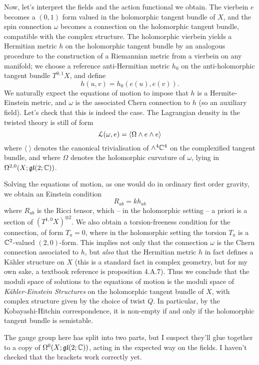 \documentclass[10pt, oneside]{article}
\begin{document}
Now, let's interpret the fields and the action functional we obtain.  The vierbein $e$ becomes a $(0,1)$ form valued in the holomorphic tangent bundle of $X$, and the spin connection $\omega$ becomes a connection on the holomorphic tangent bundle, compatible with the complex structure.  The holomorphic vierbein yields a Hermitian metric $h$ on the holomorphic tangent bundle by an analogous procedure to the construction of a Riemannian metric from a vierbein on any manifold; we choose a reference anti-Hermitian metric $h_0$ on the anti-holomorphic tangent bundle $T^{0,1}X$, and define
\[h(u, v) = h_0(e(u), e(v)).\]
We naturally expect the equations of motion to impose that $h$ is a Hermite-Einstein metric, and $\omega$ is the associated Chern connection to $h$ (so an auxiliary field).  Let's check that this is indeed the case.  The Lagrangian density in the twisted theory is still of form 
\[\mathcal{L}(\omega, e) = \langle \Omega \wedge e \wedge e \rangle\]
where $\langle \; \rangle$ denotes the canonical trivialisation of $\wedge^4 \mathbb{C}^4$ on the complexified tangent bundle, and where $\Omega$ denotes the holomorphic curvature of $\omega$, lying in $\Omega^{2,0}(X; \mathfrak{gl}(2;\mathbb{C}))$.

Solving the equations of motion, as one would do in ordinary first order gravity, we obtain an Einstein condition
\[R_{ab} = k h_{ab}\]
where $R_{ab}$ is the Ricci tensor, which -- in the holomorphic setting -- a priori is a section of $(T^{1,0}X)^{\otimes 2}$.  We also obtain a torsion-freeness condition for the connection, of form $T_a = 0$, where in the holomorphic setting the torsion $T_a$ is a $\mathbb{C}^2$-valued $(2,0)$-form.  This implies not only that the connection $\omega$ is the Chern connection associated to $h$, but \emph{also} that the Hermitian metric $h$ in fact defines a K\"ahler structure on $X$ (this is a standard fact in complex geometry, but for my own sake, a textbook reference is \cite{Huybrechts} proposition 4.A.7).  Thus we conclude that the moduli space of solutions to the equations of motion is the moduli space of \emph{K\"ahler-Einstein Structures} on the holomorphic tangent bundle of $X$, with complex structure given by the choice of twist $Q$.  In particular, by the Kobayashi-Hitchin correspondence, it is non-empty if and only if the holomorphic tangent bundle is semistable.

\begin{remark}
The gauge group here has split into two parts, but I suspect they'll glue together to a copy of $\Omega^0(X;\mathfrak{gl}(2;\mathbb{C}))$, acting in the expected way on the fields.  I haven't checked that the brackets work correctly yet.
\end{remark}
\end{document}
